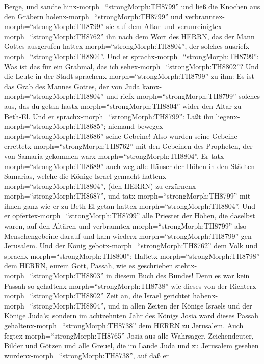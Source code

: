 Berge, und sandte hinx-morph=``strongMorph:TH8799'' und ließ die Knochen
aus den Gräbern holenx-morph=``strongMorph:TH8799'' und
verbranntex-morph=``strongMorph:TH8799'' sie auf dem Altar und
verunreinigtex-morph=``strongMorph:TH8762'' ihn nach dem Wort des HERRN,
das der Mann Gottes ausgerufen hattex-morph=``strongMorph:TH8804'', der
solches ausriefx-morph=``strongMorph:TH8804''.  Und er
sprachx-morph=``strongMorph:TH8799'': Was ist das für ein Grabmal, das
ich sehex-morph=``strongMorph:TH8802''? Und die Leute in der Stadt
sprachenx-morph=``strongMorph:TH8799'' zu ihm: Es ist das Grab des
Mannes Gottes, der von Juda kamx-morph=``strongMorph:TH8804'' und
riefx-morph=``strongMorph:TH8799'' solches aus, das du getan
hastx-morph=``strongMorph:TH8804'' wider den Altar zu Beth-El.
 Und er sprachx-morph=``strongMorph:TH8799'': Laßt ihn
liegenx-morph=``strongMorph:TH8685''; niemand
bewegex-morph=``strongMorph:TH8686'' seine Gebeine! Also wurden seine
Gebeine errettetx-morph=``strongMorph:TH8762'' mit den Gebeinen des
Propheten, der von Samaria gekommen warx-morph=``strongMorph:TH8804''.
 Er tatx-morph=``strongMorph:TH8689'' auch weg alle Häuser
der Höhen in den Städten Samarias, welche die Könige Israel gemacht
hattenx-morph=``strongMorph:TH8804'', (den HERRN) zu
erzürnenx-morph=``strongMorph:TH8687'', und
tatx-morph=``strongMorph:TH8799'' mit ihnen ganz wie er zu Beth-El getan
hattex-morph=``strongMorph:TH8804''.  Und er
opfertex-morph=``strongMorph:TH8799'' alle Priester der Höhen, die
daselbst waren, auf den Altären und
verbranntex-morph=``strongMorph:TH8799'' also Menschengebeine darauf und
kam wiederx-morph=``strongMorph:TH8799'' gen Jerusalem. 
Und der König gebotx-morph=``strongMorph:TH8762'' dem Volk und
sprachx-morph=``strongMorph:TH8800'':
Haltetx-morph=``strongMorph:TH8798'' dem HERRN, eurem Gott, Passah, wie
es geschrieben stehtx-morph=``strongMorph:TH8803'' in diesem Buch des
Bundes!  Denn es war kein Passah so
gehaltenx-morph=``strongMorph:TH8738'' wie dieses von der
Richterx-morph=``strongMorph:TH8802'' Zeit an, die Israel gerichtet
habenx-morph=``strongMorph:TH8804'', und in allen Zeiten der Könige
Israels und der Könige Juda's;  sondern im achtzehnten Jahr
des Königs Josia ward dieses Passah
gehaltenx-morph=``strongMorph:TH8738'' dem HERRN zu Jerusalem.
 Auch fegtex-morph=``strongMorph:TH8765'' Josia aus alle
Wahrsager, Zeichendeuter, Bilder und Götzen und alle Greuel, die im
Lande Juda und zu Jerusalem gesehen
wurdenx-morph=``strongMorph:TH8738'', auf daß er
